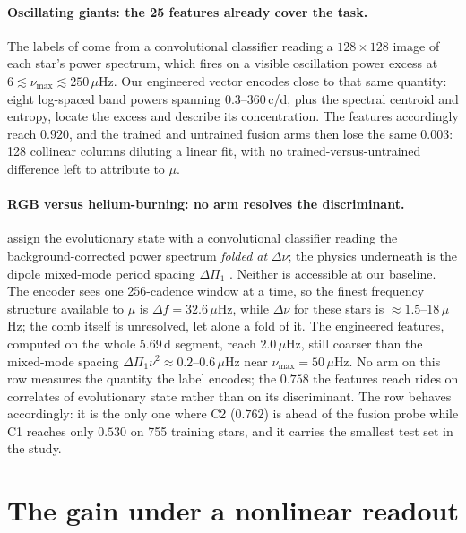 \documentclass{article}
\begin{document}
\paragraph{Oscillating giants: the 25 features already cover the task.} The labels of
\citet{hon2021} come from a convolutional classifier reading a $128 \times 128$ image of each star's
power spectrum, which fires on a visible oscillation power excess at
$6 \lesssim \nu_{\max} \lesssim 250\,\mu$Hz. Our engineered vector encodes close to that same
quantity: eight log-spaced band powers spanning 0.3--360\,c/d, plus the spectral centroid and
entropy, locate the excess and describe its concentration. The features accordingly reach $0.920$,
and the trained and untrained fusion arms then lose the same $0.003$: 128 collinear columns
diluting a linear fit, with no trained-versus-untrained difference left to attribute to $\mu$.

\paragraph{RGB versus helium-burning: no arm resolves the discriminant.} \citet{sreenivas2026} assign
the evolutionary state with a convolutional classifier reading the background-corrected power spectrum
\emph{folded at} $\Delta\nu$; the physics underneath is the dipole mixed-mode period spacing
$\Delta\Pi_{1}$ \citep{bedding2011}. Neither is accessible at our baseline. The encoder sees one
256-cadence window at a time, so the finest frequency structure available to $\mu$ is
$\Delta f = 32.6\,\mu$Hz, while $\Delta\nu$ for these stars is $\approx 1.5$--$18\,\mu$Hz; the comb
itself is unresolved, let alone a fold of it. The engineered features, computed on the whole 5.69\,d
segment, reach $2.0\,\mu$Hz, still coarser than the mixed-mode spacing
$\Delta\Pi_{1}\nu^{2} \approx 0.2$--$0.6\,\mu$Hz near $\nu_{\max} = 50\,\mu$Hz. No arm on this row
measures the quantity the label encodes; the $0.758$ the features reach rides on correlates of
evolutionary state rather than on its discriminant. The row behaves accordingly: it is the only one
where C2 ($0.762$) is ahead of the fusion probe while C1 reaches only $0.530$ on 755 training stars,
and it carries the smallest test set in the study.

\section{The gain under a nonlinear readout}
\label{app:readout}

\begin{table}[H]
\caption{What 128 added columns change, relative to the 25 features alone, under each frozen readout
(mean over six encoder seeds; absolute scores are in Table~\ref{tab:scorecard}). $+\mu$: our encoder.
No prediction term: the same recipe trained without the GRU prediction term. Untrained: a randomly
initialised encoder, which is a single encoder and carries no band. Bold: beyond $2\,\mathrm{SE}$. The
last row counts tasks won, tied and lost at that bar.}
\label{tab:readout}
\centering
\scriptsize

\end{table}
\end{document}
